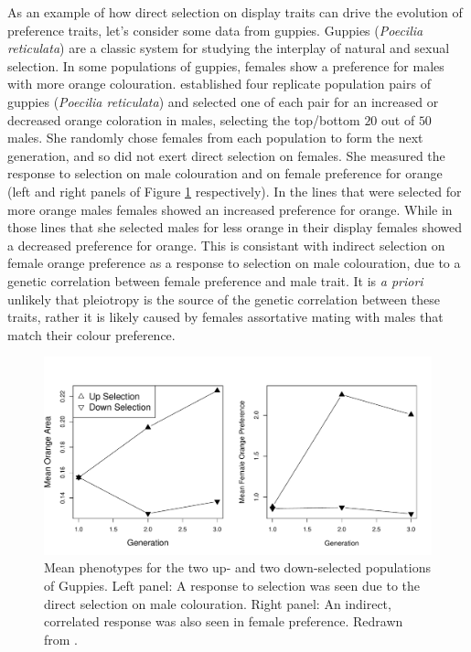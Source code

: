 As an example of how direct selection on display traits can drive the
evolution of preference traits, let's consider some data from
guppies. Guppies ({\it Poecilia reticulata}) are a classic system for
studying the interplay of natural and sexual selection. In some populations of
guppies, females show a preference for males with more orange
colouration. \citeauthor{houde:94} established four replicate
population pairs of guppies ({\it Poecilia reticulata}) and selected one of each pair for
an increased or decreased orange coloration in males, selecting the top/bottom $20$ out of $50$
males. She randomly chose females from each population to form the next generation, and so did not
exert direct selection on females. She measured the response to 
selection on male colouration and on female preference for orange (left
and right panels of Figure \ref{fig:assort_mating_guppies}
respectively). In the lines that were selected for more orange males
females showed an increased preference for orange. While in those
lines that she selected males for less orange in their display females
showed a decreased preference for orange. This is consistant with indirect selection on female orange preference as a response to
selection on male colouration, due to a genetic correlation between
female preference and male trait. It is {\it a priori} unlikely
that pleiotropy is the source of the genetic correlation between these
traits, rather it is likely caused by females assortative mating with
males that match their colour preference. 

\begin{figure}
\begin{center}
\includegraphics[width=\textwidth]{Journal_figs/Quant_gen/guppies_female_choice/guppies_female_choice.pdf}
\end{center} \label{fig:assort_mating_guppies}
\caption{Mean phenotypes for the two up- and two down-selected
  populations of Guppies. Left panel: A response to selection was seen
  due to the direct selection on male colouration. Right panel: An
  indirect, correlated response was also seen in female preference. Redrawn from \citeauthor{houde:94}.}
\end{figure}


